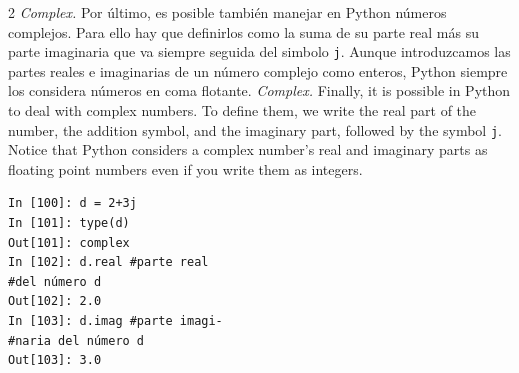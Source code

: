 \begin{paracol}{2}        
\emph{Complex.} Por último, es posible también manejar en Python números complejos. Para ello hay que definirlos como la suma de su parte real más su parte imaginaria que va siempre seguida del simbolo \texttt{j}. Aunque introduzcamos las partes reales e imaginarias de un número complejo como enteros, Python siempre los considera números en coma flotante.
\switchcolumn \emph{Complex.} Finally, it is possible in Python to deal with complex numbers. To define them, we write the real part of the number, the addition symbol, and the imaginary part, followed by the symbol \texttt{j}. Notice that Python considers a complex number's real and imaginary parts as floating point numbers even if you write them as integers.  
\end{paracol}

\begin{center}
\begin{minipage}{0.2\textwidth}
\begin{verbatim}
In [100]: d = 2+3j
In [101]: type(d)
Out[101]: complex
In [102]: d.real #parte real
#del número d
Out[102]: 2.0
In [103]: d.imag #parte imagi-
#naria del número d
Out[103]: 3.0
\end{verbatim}
\end{minipage}
\end{center}


\begin{figure}
\end{figure}

